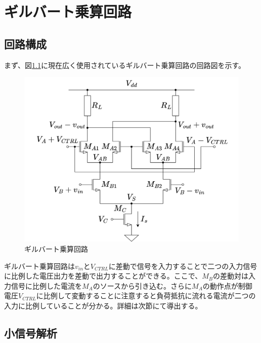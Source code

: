 \chapter{ギルバート乗算回路}
    \section{回路構成}
        まず、図\ref{fig:2_gilbert}に現在広く使用されているギルバート乗算回路の回路図を示す。
        \begin{figure}[bth]
            \begin{center}
                \includegraphics[width=160mm]{figures/chapter2/gilbert.png}
                \caption{ギルバート乗算回路}
                \label{fig:2_gilbert}
            \end{center}
        \end{figure}
        ギルバート乗算回路は$v_{in}$と$V_{CTRL}$に差動で信号を入力することで二つの入力信号に比例した電圧出力を差動で出力することができる。ここで、$M_{B}$の差動対は入力信号に比例した電流を$M_{A}$のソースから引き込む。さらに$M_{A}$の動作点が制御電圧$V_{CTRL}$に比例して変動することに注意すると負荷抵抗に流れる電流が二つの入力に比例していることが分かる。詳細は次節にて導出する。


    \section{小信号解析}
